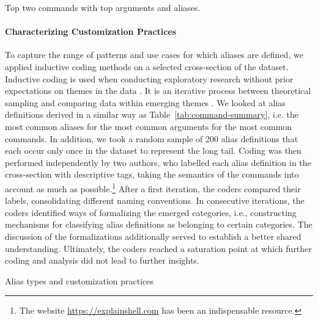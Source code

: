 \documentclass[smallextended,natbib]{svjour3}
\newcommand{\num}[1]{\numprint{#1}}
\begin{document}
\begin{table}
    \centering
    \caption{Top two commands with top arguments and aliases.}
    \label{tab:command-summary}
    
\end{table}

\paragraph{Characterizing Customization Practices}

To capture the range of patterns and use cases for which aliases are defined, we applied inductive coding methods on a selected cross-section of the dataset.
Inductive coding is used when conducting exploratory research without prior expectations on themes in the data \citep{thomas:06}.
It is an iterative process between theoretical sampling and comparing data within emerging themes \citep{dey:03}.
We looked at \num{1381} alias definitions derived in a similar way as Table~\ref{tab:command-summary}, i.e. the most common aliases for the most common arguments for the most common commands.
In addition, we took a random sample of 200 alias definitions that each occur only once in the dataset to represent the long tail.
Coding was then performed independently by two authors, who labelled each alias definition in the cross-section with descriptive tags, taking the semantics of the commands into account as much as possible.\footnote{The website \url{https://explainshell.com} has been an indispensable resource.}
After a first iteration, the coders compared their labels, consolidating different naming conventions.
In consecutive iterations, the coders identified ways of formalizing the emerged categories, i.e., constructing mechanisms for classifying alias definitions as belonging to certain categories.
The discussion of the formalizations additionally served to establish a better shared understanding.
Ultimately, the coders reached a saturation point at which further coding and analysis did not lead to further insights.

\begin{table}
    \centering
	\caption{Alias types and customization practices}
    \label{tab:practices}
    
\end{table}
\end{document}
